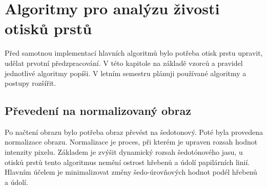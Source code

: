 \chapter{Algoritmy pro analýzu živosti otisků prstů}
Před samotnou implementací hlavních algoritmů bylo potřeba otisk prstu upravit, udělat prvotní předzpracování. V této kapitole na základě vzorců a pravidel jednotlivé algoritmy popíši. V letním semestru plánuji používané algoritmy a postupy rozšířit. 
\section{Převedení na normalizovaný obraz}
Po načtení obrazu bylo potřeba obraz převést na šedotonový. Poté byla provedena normalizace obrazu. Normalizace je proces, při kterém je upraven rozsah hodnot intenzity pixelu. Základem je zvýšit dynamický rozsah šedotónového jasu, u otisků prstů tento algoritmus nemění ostrost hřebenů a údolí papilárních linií. Hlavním účelem je minimalizovat změny šedo-úrovňových hodnot podél hřebenů a údolí. 

